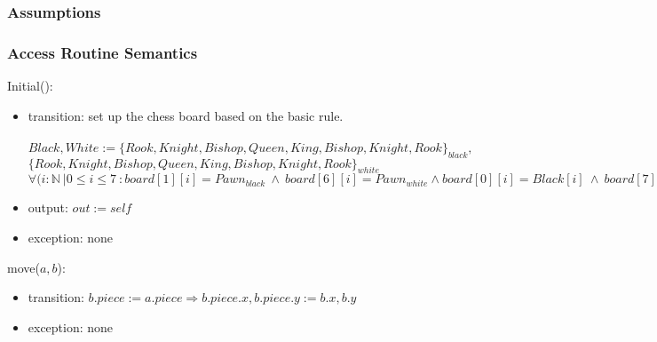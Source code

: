 \documentclass[12pt]{article}
\begin{document}
\subsubsection* {Assumptions}

\subsubsection* {Access Routine Semantics}

Initial():
\begin{itemize}
\item transition: set up the chess board based on the basic rule. \\
\\
$Black, White := \{Rook, Knight, Bishop, Queen, King, Bishop, Knight, Rook\}_{black}, $\\
$\{Rook, Knight, Bishop, Queen, King, Bishop, Knight, Rook\}_{white}$\\
$\forall(i : \mathbb{N}\ | 0 \leq i \leq 7 \ : board[1][i] = Pawn_{black} \ \wedge \ board[6][i] = Pawn_{white} \wedge board[0][i] = Black[i] \ \wedge \ board[7][i] = White[i]$
\item output: $out := \mathit{self}$
\item exception: none
\end{itemize}

\noindent move($a, b$):
\begin{itemize}
\item transition: $b.piece := a.piece \Rightarrow b.piece.x , b.piece.y := b.x, b.y$
\item exception: none
\end{itemize}
\end{document}
